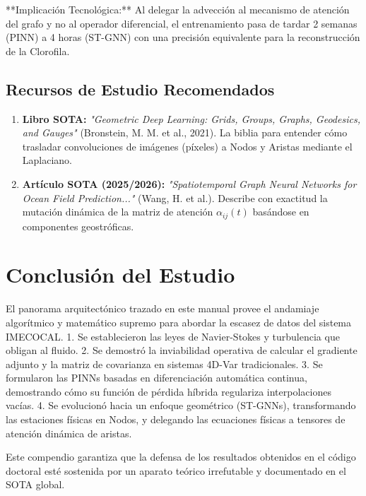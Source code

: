 \documentclass[11pt,a4paper]{article}
\begin{document}
**Implicación Tecnológica:** Al delegar la advección al mecanismo de atención del grafo y no al operador diferencial, el entrenamiento pasa de tardar 2 semanas (PINN) a 4 horas (ST-GNN) con una precisión equivalente para la reconstrucción de la Clorofila.

\subsection{Recursos de Estudio Recomendados}
\begin{enumerate}
    \item \textbf{Libro SOTA:} \textit{"Geometric Deep Learning: Grids, Groups, Graphs, Geodesics, and Gauges"} (Bronstein, M. M. et al., 2021). La biblia para entender cómo trasladar convoluciones de imágenes (píxeles) a Nodos y Aristas mediante el Laplaciano.
    \item \textbf{Artículo SOTA (2025/2026):} \textit{"Spatiotemporal Graph Neural Networks for Ocean Field Prediction..."} (Wang, H. et al.). Describe con exactitud la mutación dinámica de la matriz de atención $\alpha_{ij}(t)$ basándose en componentes geostróficas.
\end{enumerate}

\newpage
\section{Conclusión del Estudio}
El panorama arquitectónico trazado en este manual provee el andamiaje algorítmico y matemático supremo para abordar la escasez de datos del sistema IMECOCAL.
1. Se establecieron las leyes de Navier-Stokes y turbulencia que obligan al fluido.
2. Se demostró la inviabilidad operativa de calcular el gradiente adjunto y la matriz de covarianza en sistemas 4D-Var tradicionales.
3. Se formularon las PINNs basadas en diferenciación automática continua, demostrando cómo su función de pérdida híbrida regulariza interpolaciones vacías.
4. Se evolucionó hacia un enfoque geométrico (ST-GNNs), transformando las estaciones físicas en Nodos, y delegando las ecuaciones físicas a tensores de atención dinámica de aristas.

Este compendio garantiza que la defensa de los resultados obtenidos en el código doctoral esté sostenida por un aparato teórico irrefutable y documentado en el SOTA global.
\end{document}
